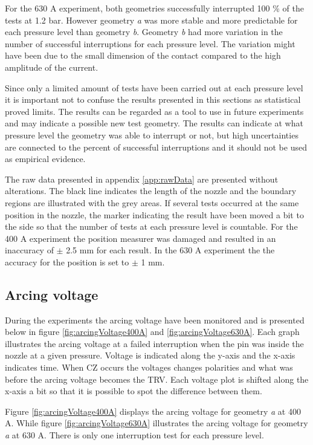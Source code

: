 \documentclass[10pt,a4paper]{article}
\begin{document}
For the 630 A experiment, both geometries successfully interrupted 100 \% of the tests at 1.2 bar. However geometry \textit{a} was more stable and more predictable for each pressure level than geometry \textit{b}. Geometry \textit{b} had more variation in the number of successful interruptions for each pressure level. The variation might have been due to the small dimension of the contact compared to the high amplitude of the current.

Since only a limited amount of tests have been carried out at each pressure level it is important not to confuse the results presented in this sections as statistical proved limits. The results can be regarded as a tool to use in future experiments and may indicate a possible new test geometry. The results can indicate at what pressure level the geometry was able to interrupt or not, but high uncertainties are connected to the percent of successful interruptions and it should not be used as empirical evidence.

The raw data presented in appendix \ref{app:rawData} are presented without alterations. The black line indicates the length of the nozzle and the boundary regions are illustrated with the grey areas. If several tests occurred at the same position in the nozzle, the marker indicating the result have been moved a bit to the side so that the number of tests at each pressure level is countable. For the 400 A experiment the position measurer was damaged and resulted in an inaccuracy of $\pm$ 2.5 mm for each result. In the 630 A experiment the the accuracy for the position is set to $\pm$ 1 mm.

\newpage
\subsection{Arcing voltage}
During the experiments the arcing voltage have been monitored and is presented below in figure \ref{fig:arcingVoltage400A} and \ref{fig:arcingVoltage630A}. Each graph illustrates the arcing voltage at a failed interruption when the pin was inside the nozzle at a given pressure. Voltage is indicated along the y-axis and the x-axis indicates time. When CZ occurs the voltages changes polarities and what was before the arcing voltage becomes the TRV. Each voltage plot is shifted along the x-axis a bit so that it is possible to spot the difference between them.

Figure \ref{fig:arcingVoltage400A} displays the arcing voltage for geometry \textit{a} at 400 A. While figure \ref{fig:arcingVoltage630A} illustrates the arcing voltage for geometry \textit{a} at 630 A. There is only one interruption test for each pressure level.
\end{document}
